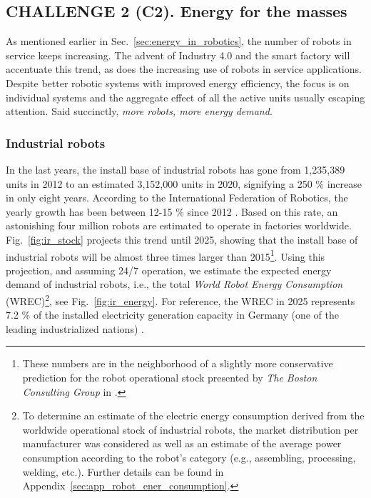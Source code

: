 \subsection{\textbf{CHALLENGE 2} (C2). Energy for the masses}\label{sec:robots_challenge}
As mentioned earlier in Sec.~\ref{sec:energy_in_robotics}, the number of robots in service keeps increasing. The advent of Industry 4.0 and the smart factory will accentuate this trend, as does the increasing use of robots in service applications. Despite better robotic systems with improved energy efficiency, the focus is on individual systems and the aggregate effect of all the active units usually escaping attention. Said succinctly, \emph{more robots, more energy demand}.

\subsubsection{Industrial robots}
In the last years, the install base of industrial robots has gone from 1,235,389 units in 2012 to an estimated 3,152,000 units in 2020, signifying a 250 \% increase in only eight years. According to the International Federation of Robotics, the yearly growth has been between 12-15 \% since 2012 \cite{IFR2019}. Based on this rate, an astonishing four million robots are estimated to operate in factories worldwide. Fig.~\ref{fig:ir_stock} projects this trend until 2025, showing that the install base of industrial robots will be almost three times larger than 2015\footnote{These numbers are in the neighborhood of a slightly more conservative prediction for the robot operational stock presented by \textit{The Boston Consulting Group} in \cite{sirkin2015}.}. Using this projection, and assuming 24/7 operation, we estimate the expected energy demand of industrial robots, i.e., the total \textit{World Robot Energy Consumption} (WREC)\footnote{To determine an estimate of the electric energy consumption derived from the worldwide operational stock of industrial robots, the market distribution per manufacturer was considered as well as an estimate of the average power consumption according to the robot's category (e.g., assembling, processing, welding, etc.). Further details can be found in Appendix~\ref{sec:app_robot_ener_consumption}.}, see Fig.~\ref{fig:ir_energy}. For reference, the WREC in 2025 represents 7.2 \% of the installed electricity generation capacity in Germany (one of the leading industrialized nations) \cite{fraunhofer2016}. 

